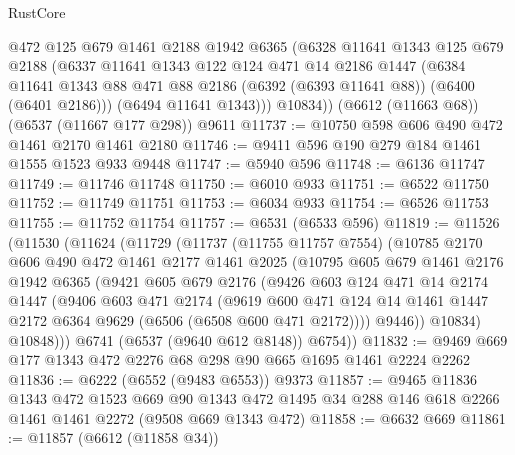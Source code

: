 \begin{lexlean}{RustCore}
\begin{coremodule}
        @472
        @125
        @679
        @1461
        @2188
        @1942
        @6365
        (@6328
          @11641
          @1343
          @125
          @679
          @2188
          (@6337
            @11641
            @1343
            @122
            @124
            @471
            @14
            @2186
            @1447
            (@6384 @11641 @1343 @88 @471 @88 @2186 (@6392 (@6393 @11641 @88)) (@6400 (@6401 @2186)))
            (@6494 @11641 @1343)))
        @10834))
    (@6612 (@11663 @68))
    (@6537 (@11667 @177 @298))
    @9611
@11737 := @10750 @598 @606 @490 @472 @1461 @2170 @1461 @2180
@11746 := @9411 @596 @190 @279 @184 @1461 @1555 @1523 @933 @9448
@11747 := @5940 @596
@11748 := @6136 @11747
@11749 := @11746 @11748
@11750 := @6010 @933
@11751 := @6522 @11750
@11752 := @11749 @11751
@11753 := @6034 @933
@11754 := @6526 @11753
@11755 := @11752 @11754
@11757 := @6531 (@6533 @596)
@11819 := @11526
    (@11530
      (@11624
        (@11729
          (@11737
            (@11755 @11757 @7554)
            (@10785
              @2170
              @606
              @490
              @472
              @1461
              @2177
              @1461
              @2025
              (@10795
                @605
                @679
                @1461
                @2176
                @1942
                @6365
                (@9421
                  @605
                  @679
                  @2176
                  (@9426
                    @603
                    @124
                    @471
                    @14
                    @2174
                    @1447
                    (@9406
                      @603
                      @471
                      @2174
                      (@9619
                        @600
                        @471
                        @124
                        @14
                        @1461
                        @1447
                        @2172
                        @6364
                        @9629
                        (@6506 (@6508 @600 @471 @2172))))
                    @9446))
                @10834)
              @10848)))
        @6741
        (@6537 (@9640 @612 @8148))
        @6754))
@11832 := @9469 @669 @177 @1343 @472 @2276 @68 @298 @90 @665 @1695 @1461 @2224 @2262
@11836 := @6222 (@6552 (@9483 @6553)) @9373
@11857 := @9465
    @11836
    @1343
    @472
    @1523
    @669
    @90
    @1343
    @472
    @1495
    @34
    @288
    @146
    @618
    @2266
    @1461
    @1461
    @2272
    (@9508 @669 @1343 @472)
@11858 := @6632 @669
@11861 := @11857 (@6612 (@11858 @34))

\end{coremodule}
\end{lexlean}
